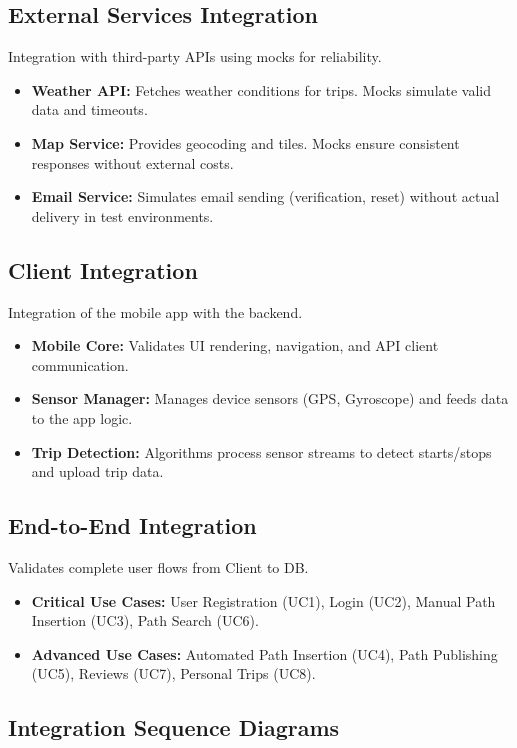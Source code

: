 \subsection{External Services Integration}
Integration with third-party APIs using mocks for reliability.
\begin{itemize}
    \item \textbf{Weather API:} Fetches weather conditions for trips. Mocks simulate valid data and timeouts.
    \item \textbf{Map Service:} Provides geocoding and tiles. Mocks ensure consistent responses without external costs.
    \item \textbf{Email Service:} Simulates email sending (verification, reset) without actual delivery in test environments.
\end{itemize}

\subsection{Client Integration}
Integration of the mobile app with the backend.
\begin{itemize}
    \item \textbf{Mobile Core:} Validates UI rendering, navigation, and API client communication.
    \item \textbf{Sensor Manager:} Manages device sensors (GPS, Gyroscope) and feeds data to the app logic.
    \item \textbf{Trip Detection:} Algorithms process sensor streams to detect starts/stops and upload trip data.
\end{itemize}

\subsection{End-to-End Integration}
Validates complete user flows from Client to DB.
\begin{itemize}
    \item \textbf{Critical Use Cases:} User Registration (UC1), Login (UC2), Manual Path Insertion (UC3), Path Search (UC6).
    \item \textbf{Advanced Use Cases:} Automated Path Insertion (UC4), Path Publishing (UC5), Reviews (UC7), Personal Trips (UC8).
\end{itemize}

\subsection{Integration Sequence Diagrams}
\label{subsec:integration_sequence_diagrams}

